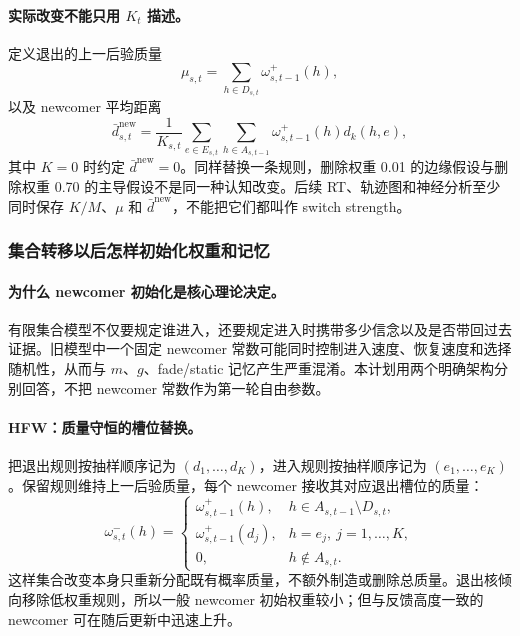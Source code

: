 \paragraph{实际改变不能只用 $K_t$ 描述。}
定义退出的上一后验质量
\begin{equation}
    \mu_{s,t}
    =\sum_{h\in D_{s,t}}\omega^+_{s,t-1}(h),
    \label{eq:model0804-removed-mass}
\end{equation}
以及 newcomer 平均距离
\begin{equation}
    \bar d^{\mathrm{new}}_{s,t}
    =\frac{1}{K_{s,t}}
      \sum_{e\in E_{s,t}}
      \sum_{h\in A_{s,t-1}}
      \omega^+_{s,t-1}(h)d_k(h,e),
    \label{eq:model0804-newcomer-distance}
\end{equation}
其中 $K=0$ 时约定 $\bar d^{\mathrm{new}}=0$。同样替换一条规则，删除权重 0.01 的边缘假设与删除权重 0.70 的主导假设不是同一种认知改变。后续 RT、轨迹图和神经分析至少同时保存 $K/M$、$\mu$ 和 $\bar d^{\mathrm{new}}$，不能把它们都叫作 switch strength。


\subsubsection{集合转移以后怎样初始化权重和记忆}

\paragraph{为什么 newcomer 初始化是核心理论决定。}
有限集合模型不仅要规定谁进入，还要规定进入时携带多少信念以及是否带回过去证据。旧模型中一个固定 newcomer 常数可能同时控制进入速度、恢复速度和选择随机性，从而与 $m$、$g$、fade/static 记忆产生严重混淆。本计划用两个明确架构分别回答，不把 newcomer 常数作为第一轮自由参数。

\paragraph{HFW：质量守恒的槽位替换。}
把退出规则按抽样顺序记为 $(d_1,\ldots,d_K)$，进入规则按抽样顺序记为 $(e_1,\ldots,e_K)$。保留规则维持上一后验质量，每个 newcomer 接收其对应退出槽位的质量：
\begin{equation}
    \omega^-_{s,t}(h)=
    \begin{cases}
      \omega^+_{s,t-1}(h),
      &h\in A_{s,t-1}\setminus D_{s,t},\\
      \omega^+_{s,t-1}(d_j),
      &h=e_j,\ j=1,\ldots,K,\\
      0,&h\notin A_{s,t}.
    \end{cases}
    \label{eq:model0804-mass-transfer}
\end{equation}
这样集合改变本身只重新分配既有概率质量，不额外制造或删除总质量。退出核倾向移除低权重规则，所以一般 newcomer 初始权重较小；但与反馈高度一致的 newcomer 可在随后更新中迅速上升。

